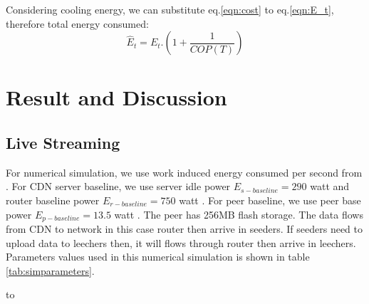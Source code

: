 Considering cooling energy, we can substitute eq.\ref{eqn:cost} to eq.\ref{eqn:E_t}, therefore total energy consumed: 
\begin{equation}
	\hat{E}_{t} = E_{t}.\left( 1+\frac{1}{COP(T)} \right)
\end{equation}


\section{Result and Discussion}\label{analysis}
\subsection{Live Streaming}
For numerical simulation, we use work induced energy consumed per second from \cite{Nedevschi:2008:HDC:1855610.1855618}.
For CDN server baseline, we use server idle power $E_{s-baseline}=290$ watt and router baseline power $E_{r-baseline}=750$ watt \cite{Nedevschi:2008:HDC:1855610.1855618}. 
For peer baseline, we use peer base power $E_{p-baseline}=13.5$ watt \cite{valancius2009greening}.
The peer has 256MB flash storage.
The data flows from CDN to network in this case router then arrive in seeders. 
If seeders need to upload data to leechers then, it will flows through router then arrive in leechers. 
Parameters values used in this numerical simulation is shown in table \ref{tab:simparameters}.
\begin{table}[thb]
\caption{Numerical Simulation Parameters.}
\label{tab:simparameters}
\hbox to
\end{table}

